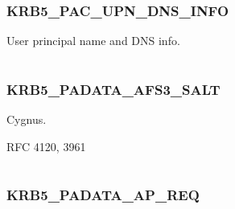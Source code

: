 \documentclass[letterpaper,10pt,english]{sphinxmanual}
\begin{document}
\subsubsection{KRB5\_PAC\_UPN\_DNS\_INFO}
\label{appdev/refs/macros/KRB5_PAC_UPN_DNS_INFO:krb5-pac-upn-dns-info-data}\label{appdev/refs/macros/KRB5_PAC_UPN_DNS_INFO::doc}\label{appdev/refs/macros/KRB5_PAC_UPN_DNS_INFO:krb5-pac-upn-dns-info}

\begin{fulllineitems}
\label{appdev/refs/macros/KRB5_PAC_UPN_DNS_INFO:KRB5_PAC_UPN_DNS_INFO}
\end{fulllineitems}


User principal name and DNS info.

\begin{tabulary}{\linewidth}{|L|L|}
\hline

 & 
\\
\hline\end{tabulary}



\subsubsection{KRB5\_PADATA\_AFS3\_SALT}
\label{appdev/refs/macros/KRB5_PADATA_AFS3_SALT::doc}\label{appdev/refs/macros/KRB5_PADATA_AFS3_SALT:krb5-padata-afs3-salt}\label{appdev/refs/macros/KRB5_PADATA_AFS3_SALT:krb5-padata-afs3-salt-data}

\begin{fulllineitems}
\label{appdev/refs/macros/KRB5_PADATA_AFS3_SALT:KRB5_PADATA_AFS3_SALT}
\end{fulllineitems}


Cygnus.

RFC 4120, 3961

\begin{tabulary}{\linewidth}{|L|L|}
\hline

 & 
\\
\hline\end{tabulary}



\subsubsection{KRB5\_PADATA\_AP\_REQ}
\label{appdev/refs/macros/KRB5_PADATA_AP_REQ::doc}\label{appdev/refs/macros/KRB5_PADATA_AP_REQ:krb5-padata-ap-req-data}\label{appdev/refs/macros/KRB5_PADATA_AP_REQ:krb5-padata-ap-req}
\end{document}
